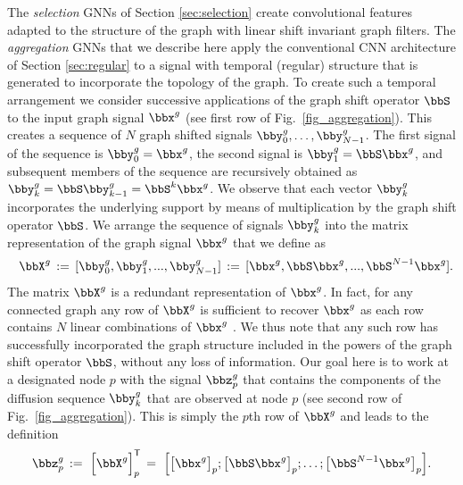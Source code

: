 
%
The {\it selection} GNNs of Section \ref{sec:selection} create convolutional features adapted to the structure of the graph with linear shift invariant graph filters. The {\it aggregation} GNNs that we describe here apply the conventional CNN architecture of Section \ref{sec:regular} to a signal with temporal (regular) structure that is generated to incorporate the topology of the graph. To create such a temporal arrangement we consider successive applications of the graph shift operator $\bbS$ to the input graph signal $\bbx^g$ (see first row of Fig.~\ref{fig_aggregation}). This creates a sequence of $N$ graph shifted signals $\bby^g_0, \ldots, \bby^g_{N-1}$. The first signal of the sequence is $\bby^g_0 = \bbx^g$, the second signal is $\bby^g_1 = \bbS\bbx^g$, and subsequent members of the sequence are recursively obtained as $\bby^g_k = \bbS\bby^g_{k-1} = \bbS^{k}\bbx^g$. We observe that each vector $\bby_{k}^{g}$ incorporates the underlying support by means of multiplication by the graph shift operator $\bbS$. We arrange the sequence of signals $\bby^g_k$ into the matrix representation of the graph signal $\bbx^g$ that we define as
% 
\begin{equation} \label{eqn:aggregation_matrix}
   \,\, \bbX^g \, := \, [\bby^g_0,     \bby^g_1, ...,           \bby^g_{N-1}] 
          \, := \, [\bbx^g,   \bbS\bbx^g,   ..., \bbS^{N-1}\bbx^g      ] .\!\!
\end{equation}
%
The matrix $\bbX^g$ is a redundant representation of $\bbx^g$. In fact, for any connected graph any row of $\bbX^g$ is sufficient to recover $\bbx^g$ as each row contains $N$ linear combinations of $\bbx^g$ \cite{marques16-aggregation}. We thus note that any such row has successfully incorporated the graph structure included in the powers of the graph shift operator $\bbS$, without any loss of information. Our goal here is to work at a designated node $p$ with the signal $\bbz_p^g$ that contains the components of the diffusion sequence $\bby^g_k$ that are observed at node $p$ (see second row of Fig.~\ref{fig_aggregation}). This is simply the $p$th row of $\bbX^g$ and leads to the definition
% 
\begin{equation} \label{eqn:agg_representation}
   \bbz_p^g \,:=\ \Big[\bbX^g\Big]_p^{\Tr}
            \, =\ \Big[ \big[          \bbx^g\big]_{p} ; 
                        \big[\bbS      \bbx^g\big]_{p} ; \ldots ; 
                        \big[\bbS^{N-1}\bbx^g\big]_{p} 
                  \Big].
\end{equation}
